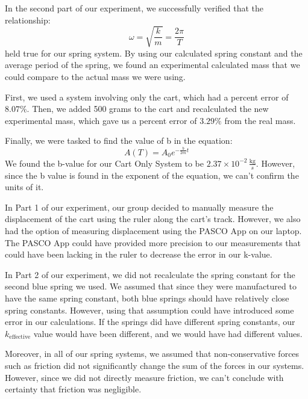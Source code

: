 \documentclass[fleqn]{article}
\begin{document}
In the second part of our experiment, we successfully verified that the relationship:
\[ \omega  = \sqrt{\frac{k}{m} } = \frac{2 \pi}{T}  \]
held true for our spring system. By using our calculated spring constant and the average period of the spring, we found an experimental calculated mass that we could compare to the actual mass we were using.

First, we used a system involving only the cart, which had a percent error of $8.07\%$. Then, we added 500 grams to the cart and recalculated the new experimental mass, which gave us a percent error of $3.29\%$ from the real mass.

Finally, we were tasked to find the value of b in the equation:
\[ A(T) = A_0 e ^{- \frac{b}{2m} t} \]
We found the b-value for our Cart Only System to be $2.37 \times 10 ^{-2} \, \frac{\text{kg} }{s} $. However, since the b value is found in the exponent of the equation, we can't confirm the units of it.

In Part 1 of our experiment, our group decided to manually measure the displacement of the cart using the ruler along the cart's track. However, we also had the option of measuring displacement using the PASCO App on our laptop. The PASCO App could have provided more precision to our measurements that could have been lacking in the ruler to decrease the error in our k-value.

In Part 2 of our experiment, we did not recalculate the spring constant for the second blue spring we used. We assumed that since they were manufactured to have the same spring constant, both blue springs should have relatively close spring constants. However, using that assumption could have introduced some error in our calculations. If the springs did have different spring constants, our $k _{\text{effective} } $ value would have been different, and we would have had different values.

Moreover, in all of our spring systems, we assumed that non-conservative forces such as friction did not significantly change the sum of the forces in our systems. However, since we did not directly measure friction, we can't conclude with certainty that friction was negligible.
\end{document}
